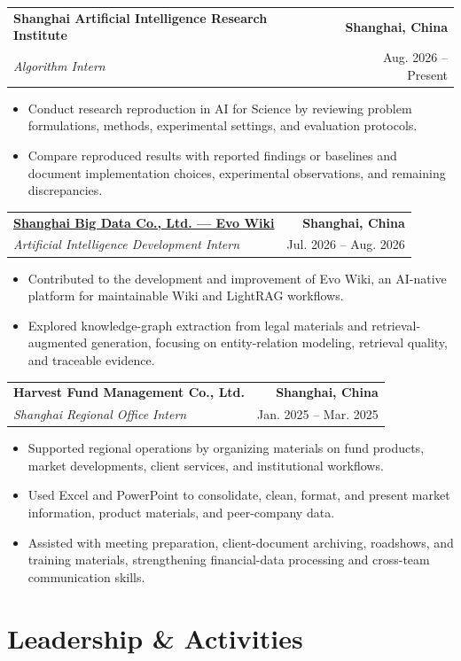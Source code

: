 \documentclass[letterpaper,10pt]{article}
\makeatletter
\newcommand{\resumeProject}[4]{
    \vspace{2pt}
    \noindent
    \begin{tabularx}{\textwidth}{@{}X@{\hspace{1em}}r@{}}
        \textbf{#1} & \textbf{#2} \\
        \textit{\textcolor{textgray}{#3}} & \textcolor{textgray}{#4} \\
    \end{tabularx}
    \vspace{-4pt}
}
\makeatother
\begin{document}
\resumeProject
{Shanghai Artificial Intelligence Research Institute}
{Shanghai, China}
{Algorithm Intern}
{Aug. 2026 -- Present}
\begin{itemize}
  \item Conduct research reproduction in AI for Science by reviewing problem formulations, methods, experimental settings, and evaluation protocols.
  \item Compare reproduced results with reported findings or baselines and document implementation choices, experimental observations, and remaining discrepancies.
\end{itemize}

\resumeProject
{\href{https://github.com/easyhang/evo_wiki}{Shanghai Big Data Co., Ltd. --- Evo Wiki}}
{Shanghai, China}
{Artificial Intelligence Development Intern}
{Jul. 2026 -- Aug. 2026}
\begin{itemize}
  \item Contributed to the development and improvement of Evo Wiki, an AI-native platform for maintainable Wiki and LightRAG workflows.
  \item Explored knowledge-graph extraction from legal materials and retrieval-augmented generation, focusing on entity-relation modeling, retrieval quality, and traceable evidence.
\end{itemize}

\resumeProject
{Harvest Fund Management Co., Ltd.}
{Shanghai, China}
{Shanghai Regional Office Intern}
{Jan. 2025 -- Mar. 2025}
\begin{itemize}
  \item Supported regional operations by organizing materials on fund products, market developments, client services, and institutional workflows.
  \item Used Excel and PowerPoint to consolidate, clean, format, and present market information, product materials, and peer-company data.
  \item Assisted with meeting preparation, client-document archiving, roadshows, and training materials, strengthening financial-data processing and cross-team communication skills.
\end{itemize}

\section{Leadership \& Activities}
\end{document}
